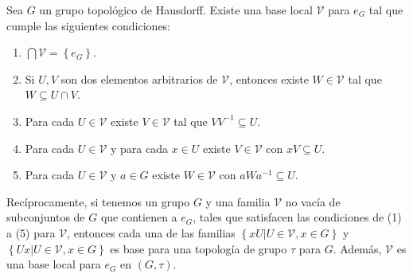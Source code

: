\documentclass[12pt]{report}
\theoremstyle{largebreak}
\begin{document}
    \begin{theor}
        Sea $G$ un grupo topológico de Hausdorff. Existe una base local $\mathcal{V}$ para $e_G$ tal que cumple las siguientes condiciones:
        \begin{enumerate}
            \item $\bigcap\mathcal{V}=\left\{e_G\right\}$.
            \item Si $U,V$ son dos elementos arbitrarios de $\mathcal{V}$, entonces existe $W\in\mathcal{V}$ tal que $W\subseteq U\cap V$.
            \item Para cada $U\in\mathcal{V}$ existe $V\in\mathcal{V}$ tal que $VV^{-1}\subseteq U$.
            \item Para cada $U\in\mathcal{V}$ y para cada $x\in U$ existe $V\in \mathcal{V}$ con $xV\subseteq U$.
            \item Para cada $U\in \mathcal{V}$ y $a\in G$ existe $W\in\mathcal{V}$ con $aWa^{-1}\subseteq U$.
        \end{enumerate}

        Recíprocamente, si tenemos un grupo $G$ y una familia $\mathcal{V}$ no vacía de subconjuntos de $G$ que contienen a $e_G$, tales que satisfacen las condiciones de (1) a (5) para $\mathcal{V}$, entonces cada una de las familias $\left\{xU\big|U\in\mathcal{V}, x\in G \right\}$ y $\left\{Ux\big|U\in\mathcal{V}, x\in G \right\}$ es base para una topología de grupo $\tau$ para $G$. Además, $\mathcal{V}$ es una base local para $e_G$ en $(G,\tau)$.
    \end{theor}
\end{document}

